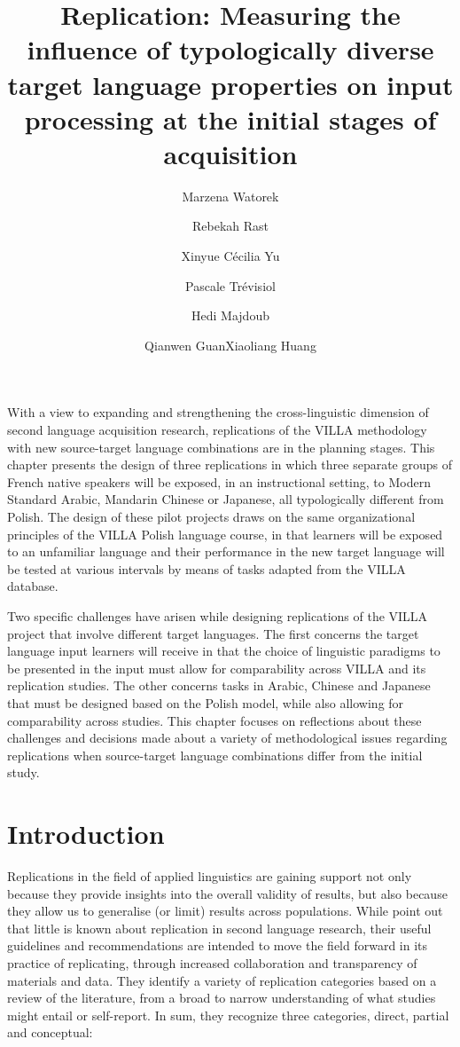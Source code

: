 \documentclass[output=paper,colorlinks,citecolor=brown,modfonts,nonflat]{../langscibook}
\author{Marzena Watorek\affiliation{Université Paris 8 \& UMR-SFL, CNRS}\orcid{}\and Rebekah Rast\affiliation{American University of Paris \& UMR-SFL, CNRS}\orcid{}\and Xinyue Cécilia Yu\affiliation{Inalco - CNRS - EHESS, CRLAO}\orcid{}\and Pascale Trévisiol\affiliation{Université Paris 3 \& DILTEC EA 2288}\orcid{}\and Hedi Majdoub\affiliation{Université Paris 8 \& UMR-SFL, CNRS}\orcid{}\and Qianwen Guan\affiliation{City University of Hong Kong}\orcid{}\lastand Xiaoliang Huang\affiliation{Beijing Foreign Studies University}\orcid{}
}
\title{Replication: Measuring the influence of typologically diverse target language properties on input processing at the initial stages of acquisition}
\begin{document}
\maketitle 
{}


{With a view to expanding and strengthening the cross-linguistic dimension of second language acquisition research, replications of the VILLA methodology with new source-target language combinations are in the planning stages. This chapter presents the design of three replications in which three separate groups of French native speakers will be exposed, in an instructional setting, to Modern Standard Arabic, Mandarin Chinese or Japanese, all typologically different from Polish. The design of these pilot projects draws on the same organizational principles of the VILLA Polish language course, in that learners will be exposed to an unfamiliar language and their performance in the new target language will be tested at various intervals by means of tasks adapted from the VILLA database.}



{Two specific challenges have arisen while designing replications of the VILLA project that involve different target languages. The first concerns the target language input learners will receive in that the choice of linguistic paradigms to be presented in the input must allow for comparability across VILLA and its replication studies. The other concerns tasks in Arabic, Chinese and Japanese that must be designed based on the Polish model, while also allowing for comparability across studies.} This chapter focuses on reflections about these challenges and decisions made about a variety of methodological issues regarding replications when source-target language combinations differ from the initial study.


\section{Introduction}\label{sec:watorek:1}

Replications in the field of applied linguistics are gaining support not only because they provide insights into the overall validity of results, but also because they allow us to generalise (or limit) results across populations. While \citet{MarsdenEtAl2018Replication} point out that little is known about replication in second language research, their useful guidelines and recommendations are intended to move the field forward in its practice of replicating, through increased collaboration and transparency of materials and data. They identify a variety of replication categories based on a review of the literature, from a broad to narrow understanding of what studies might entail or self-report. In sum, they recognize three categories, direct, partial and conceptual:
\end{document}
